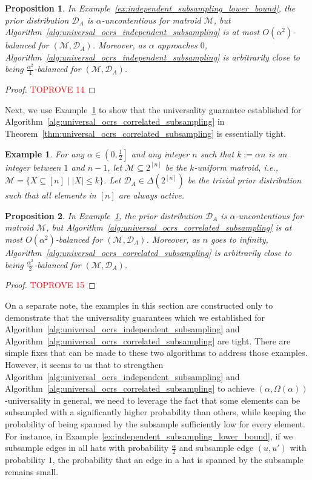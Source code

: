 \documentclass[11pt]{article}
\newcommand{\D}{\mathcal D}
\newcommand{\M}{{\mathcal M}}
\newtheorem{example}[theorem]{Example}
\newtheorem{proposition}{Proposition}[section]
\begin{document}
\begin{proposition}\label{prop:independent_subsampling_lower_bound}
In Example~\ref{ex:independent_subsampling_lower_bound}, the prior distribution $\D_A$ is $\alpha$-uncontentious for matroid $\M$, but Algorithm~\ref{alg:universal_ocrs_independent_subsampling} is at most $O(\alpha^2)$-balanced for $(\M,\D_A)$. Moreover, as $\alpha$ approaches $0$, Algorithm~\ref{alg:universal_ocrs_independent_subsampling} is arbitrarily close to being $\frac{\alpha^2}{4}$-balanced for $(\M,\D_A)$.
\end{proposition}
\begin{proof}\textcolor{red}{TOPROVE 14}\end{proof}
Next, we use Example~\ref{ex:correlated_subsampling_lower_bound} to show that the universality guarantee established for Algorithm~\ref{alg:universal_ocrs_correlated_subsampling} in Theorem~\ref{thm:universal_ocrs_correlated_subsampling} is essentially tight.
\begin{example}\label{ex:correlated_subsampling_lower_bound}
For any $\alpha\in\left(0,\frac{1}{2}\right]$ and any integer $n$ such that $k:=\alpha n$ is an integer between $1$ and $n-1$, let $\M\subseteq 2^{[n]}$ be the $k$-uniform matroid, i.e., $\M=\{X\subseteq[n]\mid |X|\le k\}$. Let $\D_A\in\Delta(2^{[n]})$ be the trivial prior distribution such that all elements in $[n]$ are always active.
\end{example}

\begin{proposition}
In Example~\ref{ex:correlated_subsampling_lower_bound}, the prior distribution $\D_A$ is $\alpha$-uncontentious for matroid $\M$, but Algorithm~\ref{alg:universal_ocrs_correlated_subsampling} is at most $O(\alpha^2)$-balanced for $(\M,\D_A)$. Moreover, as $n$ goes to infinity, Algorithm~\ref{alg:universal_ocrs_correlated_subsampling} is arbitrarily close to being $\frac{\alpha^2}{2}$-balanced for $(\M,\D_A)$.
\end{proposition}
\begin{proof}\textcolor{red}{TOPROVE 15}\end{proof}
On a separate note, the examples in this section are constructed only to demonstrate that the universality guarantees which we established for Algorithm~\ref{alg:universal_ocrs_independent_subsampling} and Algorithm~\ref{alg:universal_ocrs_correlated_subsampling} are tight. There are simple fixes that can be made to these two algorithms to address those examples. However, it seems to us that to strengthen Algorithm~\ref{alg:universal_ocrs_independent_subsampling} and Algorithm~\ref{alg:universal_ocrs_correlated_subsampling} to achieve $(\alpha,\Omega(\alpha))$-universality in general, we need to leverage the fact that some elements can be subsampled with a significantly higher probability than others, while keeping the probability of being spanned by the subsample sufficiently low for every element. For instance, in Example~\ref{ex:independent_subsampling_lower_bound}, if we subsample edges in all hats with probability $\frac{\alpha}{2}$ and subsample edge $(u,u')$ with probability $1$, the probability that an edge in a hat is spanned by the subsample remains small.
\end{document}
